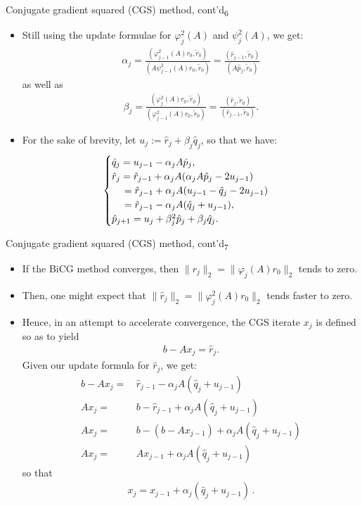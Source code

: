 \documentclass[t,usepdftitle=false]{beamer}
\begin{document}
\begin{frame}{Conjugate gradient squared (CGS) method, cont'd\textsubscript{6}}
\begin{itemize}
\item Still using the update formulae for $\varphi_j^2(A)$ and $\psi_j^2(A)$, we get:
\begin{align*}
\alpha_j=
\frac{(\varphi_{j-1}^2(A)r_0,\tilde{r}_0)}{(A\psi_{j-1}^2(A)r_0,\tilde{r}_0)}=
\frac{(\hat{r}_{j-1},\tilde{r}_0)}{(A\hat{p}_j,\tilde{r}_0)}
\end{align*}
as well as
\begin{align*}
\beta_j=
\frac{(\varphi_{j}^2(A)r_0,\tilde{r}_0)}{(\varphi_{j-1}^2(A)r_0,\tilde{r}_0)}=
\frac{(\hat{r}_{j},\tilde{r}_0)}{(\hat{r}_{j-1},\tilde{r}_0)}.
\end{align*}
\item For the sake of brevity, let $u_j:=\hat{r}_j+\beta_j\hat{q}_j$, so that we have:
\begin{align*}
\begin{cases}
\hat{q}_j=
u_{j-1}-\alpha_jA\hat{p}_j,\\
\hat{r}_j=
\hat{r}_{j-1}+\alpha_jA(\alpha_jA\hat{p}_j-2u_{j-1})\\
\hspace{.45cm}=\hat{r}_{j-1}+\alpha_jA(u_{j-1}-\hat{q}_j-2u_{j-1})\\
\hspace{.45cm}=\hat{r}_{j-1}-\alpha_jA(\hat{q}_j+u_{j-1}),\\
\hat{p}_{j+1}=
u_j+\beta_j^2\hat{p}_j+\beta_j\hat{q}_j.
\end{cases}
\end{align*}
\end{itemize}
\end{frame}

\begin{frame}{Conjugate gradient squared (CGS) method, cont'd\textsubscript{7}}
\begin{itemize}
\item If the BiCG method converges, then $\|r_j\|_2=\|\varphi_j(A)r_0\|_2$ tends to zero. 
\item[] Then, one might expect that $\|\hat{r}_j\|_2=\|\varphi_j^2(A)r_0\|_2$ tends faster to zero.
\item[] Hence, in an attempt to accelerate convergence, the CGS iterate $x_j$ is defined so as to yield
\begin{align*}
b-Ax_j=\hat{r}_j.
\end{align*}
Given our update formula for $\hat{r}_j$, we get:
\begin{align*}
b-Ax_j=&\,\hat{r}_{j-1}-\alpha_jA(\hat{q}_j+u_{j-1})\\
Ax_j=&\,b-\hat{r}_{j-1}+\alpha_jA(\hat{q}_j+u_{j-1})\\
Ax_j=&\,b-(b-Ax_{j-1})+\alpha_jA(\hat{q}_j+u_{j-1})\\
Ax_j=&\,Ax_{j-1}+\alpha_jA(\hat{q}_j+u_{j-1})
\end{align*}
so that 
\begin{align*}
\boxed{x_j=x_{j-1}+\alpha_j(\hat{q}_j+u_{j-1})}\,.
\end{align*}
\end{itemize}
\end{frame}
\end{document}
